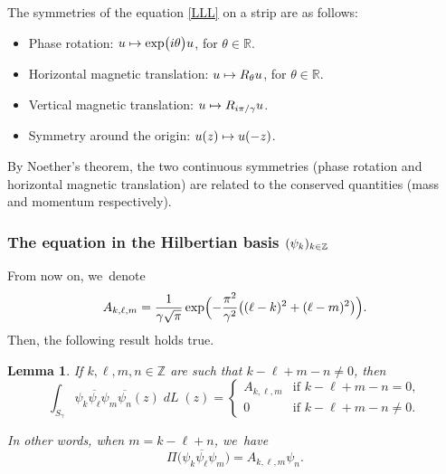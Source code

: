\documentclass[JEP,XML,SOM,Unicode,NoFloatCountersInSection,published]{cedram}
\newcommand\mto{\mathchoice{\longmapsto}{\mapsto}{\mapsto}{\mapsto}}
\DeclareMathOperator{\dL}{\mathit{dL}}
\newtheorem{lemme}[theorem]{Lemma}
\theoremstyle{definition}
\let\EE\exp
\let\dis\relax
\let\ov\overline
\newcommand\Z{\mathbb Z}
\begin{document}
The symmetries of the equation \eqref{LLL} on a strip are as follows:
\begin{itemize}
\item Phase rotation: $u \mto \EE\bigl({i \theta}\bigr) u$, for $\theta\in \mathbb{R}$.
\item Horizontal magnetic translation: $u \mto R_\theta u$, for $\theta\in \mathbb{R}$.
\item Vertical magnetic translation: $\dis u \mto R_{{i\pi}/{\gamma}} u$.
\item Symmetry around the origin: $u(z) \mto u(-z)$.
\end{itemize}

By Noether's theorem, the two continuous symmetries (phase rotation and horizontal magnetic translation) are related to the conserved quantities (mass and momentum respectively).

\subsubsection{The equation in the Hilbertian basis $\dis (\psi_k)_{k \in \Z}$}

From now on, we~denote
\begin{equation}\label{def-A}
A_{k,\ell,m} = \frac{1}{\gamma\sqrt{\pi}}\EE\Bigl(-\frac{\pi^2}{\gamma^2}\bigl((\ell-k)^2+(\ell-m)^2\bigr)\Bigr).
\end{equation}
Then, the following result holds true.

\begin{lemme}\label{lem-ortho}
If $k,\ell,m,n \in \mathbb{Z}$ are such that $k - \ell + m - n \neq 0$, then
\begin{equation*}
\int_{S_{\gamma}} \psi_{k}\ov{\psi_{\ell}} \psi_{m}\ov{\psi_{n}}(z)\dL(z)
=\begin{cases}
\displaystyle A_{k,\ell,m} & \text{if $k - \ell + m - n = 0$}, \\
0 & \text{if $k - \ell + m - n \neq 0$}.
\end{cases}
\end{equation*}

In other words, when $m = k - \ell + n$, we~have
\begin{equation}\label{proj3}
\Pi\bigl(\psi_{k}\ov{\psi_{\ell}} \psi_{m}\bigr)
=A_{k,\ell,m} \psi_{n}.
\end{equation}
\end{lemme}
\end{document}
